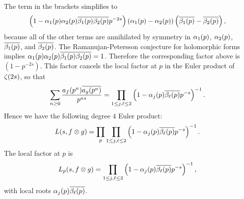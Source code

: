       \endgroup
      The term in the brackets simplifies to
      \[
        \left(1-\alpha_{1}(p)\alpha_{2}(p)\overline{\beta_{1}(p)}\overline{\beta_{2}(p)}p^{-2s}\right)(\alpha_{1}(p)-\alpha_{2}(p))\left(\overline{\beta_{1}(p)}-\overline{\beta_{2}(p)}\right),
      \]
      because all of the other terms are annihilated by symmetry in $\alpha_{1}(p)$, $\alpha_{2}(p)$, $\overline{\beta_{1}(p)}$, and $\overline{\beta_{2}(p)}$. The Ramanujan-Petersson conjecture for holomorphic forms implies $\alpha_{1}(p)\alpha_{2}(p)\overline{\beta_{1}(p)}\overline{\beta_{2}(p)} = 1$. Therefore the corresponding factor above is $(1-p^{-2s})$. This factor cancels the local factor at $p$ in the Euler product of $\zeta(2s)$, so that
      \[
        \sum_{n \ge 0}\frac{a_{f}(p^{n})\overline{a_{g}(p^{n})}}{p^{ns}} = \prod_{1 \le j,\ell \le 2}\left(1-\alpha_{j}(p)\overline{\beta_{\ell}(p)}p^{-s}\right)^{-1}.
      \]
      Hence we have the following degree $4$ Euler product:
      \[
        L(s,f \otimes g) = \prod_{p}\prod_{1 \le j,\ell \le 2}\left(1-\alpha_{j}(p)\overline{\beta_{\ell}(p)}p^{-s}\right)^{-1}.
      \]
      The local factor at $p$ is 
      \[
        L_{p}(s,f \otimes g) = \prod_{1 \le j,\ell \le 2}\left(1-\alpha_{j}(p)\overline{\beta_{\ell}(p)}p^{-s}\right)^{-1},
      \]
      with local roots $\alpha_{j}(p)\overline{\beta_{\ell}(p)}$.
